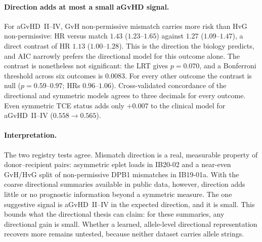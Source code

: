 \documentclass[11pt,a4paper]{article}
\begin{document}
\paragraph{Direction adds at most a small aGvHD signal.}
For aGvHD~II--IV, GvH non-permissive mismatch carries more risk than HvG
non-permissive: HR versus match $1.43$ ($1.23$--$1.65$) against $1.27$
($1.09$--$1.47$), a direct contrast of HR $1.13$ ($1.00$--$1.28$).  This is
the direction the biology predicts, and AIC narrowly prefers the directional
model for this outcome alone.  The contrast is nonetheless not significant:
the LRT gives $p=0.070$, and a Bonferroni threshold across six outcomes is
$0.0083$.  For every other outcome the contrast is null ($p=0.59$--$0.97$;
HRs $0.96$--$1.06$).  Cross-validated concordance of the directional and
symmetric models agrees to three decimals for every outcome.  Even
symmetric TCE status adds only $+0.007$ to the clinical model for
aGvHD~II--IV ($0.558\to0.565$).

\paragraph{Interpretation.}
The two registry tests agree.  Mismatch direction is a real, measurable
property of donor--recipient pairs: asymmetric eplet loads in IB20-02 and a
near-even GvH/HvG split of non-permissive DPB1 mismatches in IB19-01a.  With
the coarse directional summaries available in public data, however,
direction adds little or no prognostic information beyond a symmetric
measure.  The one suggestive signal is aGvHD~II--IV in the expected
direction, and it is small.  This bounds what the directional thesis can
claim: for these summaries, any directional gain is small.  Whether a
learned, allele-level directional representation recovers more remains
untested, because neither dataset carries allele strings.
\end{document}
